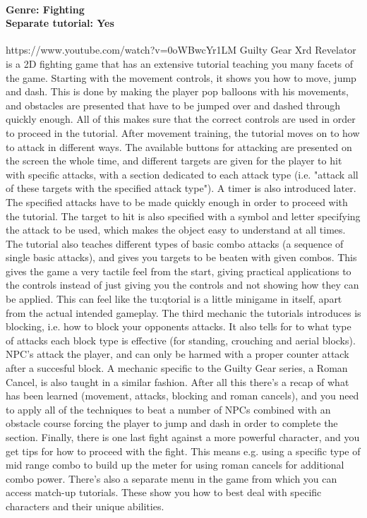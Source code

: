 \paragraph{Genre: Fighting \\ Separate tutorial: Yes \\}
https://www.youtube.com/watch?v=0oWBwcYr1LM
Guilty Gear Xrd Revelator is a 2D fighting game that has an extensive tutorial
teaching you many facets of the game. Starting with the movement controls, it
shows you how to move, jump and dash. This is done by making the player pop
balloons with his movements, and obstacles are presented that have to be
jumped over and dashed through quickly enough. All of this makes sure that the correct controls are used in
order to proceed in the tutorial.
After movement training, the tutorial moves on to how to attack in different
ways. The available buttons for attacking are presented on the screen the
whole time, and different targets are given for the player to hit with
specific attacks, with a section dedicated to each attack type (i.e. "attack
all of these targets with the specified attack type"). A timer is also
introduced later. The specified attacks have to be made quickly enough in
order to proceed with the tutorial. The target to hit is also specified with a
symbol and letter specifying the attack to be used, which makes the object
easy to understand at all times. The tutorial also teaches different types of
basic combo attacks (a sequence of single basic attacks), and gives you targets to be beaten with given combos.
This gives the game a very tactile feel from the start, giving practical
applications to the controls instead of just giving you the controls and not
showing how they can be applied. This can feel like the tu:qtorial is a little
minigame in itself, apart from the actual intended gameplay.
The third mechanic the tutorials introduces is blocking, i.e. how to block
your opponents attacks. It also tells for to what type of attacks each block
type is effective (for standing, crouching and aerial blocks). NPC's attack
the player, and can only be harmed with a proper counter attack after a
succesful block. A mechanic specific to the Guilty Gear series, a Roman
Cancel, is also taught in a similar fashion.
After all this there's a recap of what has been learned (movement, attacks,
blocking and roman cancels), and you need to apply all of the techniques to
beat a number of NPCs combined with an obstacle course forcing the player to
jump and dash in order to complete the section. Finally, there is one last
fight against a more powerful character, and you get tips for how to proceed
with the fight. This means e.g. using a specific type of mid range combo to
build up the meter for using roman cancels for additional combo power.
There's also a separate menu in the game from which you can access match-up
tutorials. These show you how to best deal with specific characters and their
unique abilities.

